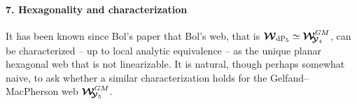 \documentclass[11pt]{amsart}
\begin{document}
\paragraph{\bf 7. Hexagonality and characterization}
It has been known since Bol's paper \cite{Bol} that Bol's web, that is 
$\boldsymbol{\mathcal W}_{ {\rm dP}_5}\simeq 
\boldsymbol{\mathcal W}_{\hspace{-0.1cm} \boldsymbol{\mathcal Y}_4}^{GM}$, 
can be characterized -- up to local analytic equivalence -- as the unique planar hexagonal web that is not linearizable. It is natural, though perhaps somewhat naive, to ask whether a similar characterization holds for the Gelfand--MacPherson web $\boldsymbol{\mathcal W}_{\hspace{-0.1cm} \boldsymbol{\mathcal Y}_5}^{GM}$.
\end{document}
